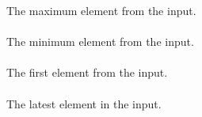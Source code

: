 The maximum element from the input.

\paragraph{}

The minimum element from the input.

\paragraph{}

The first element from the input.

\paragraph{}

The latest element in the input.


